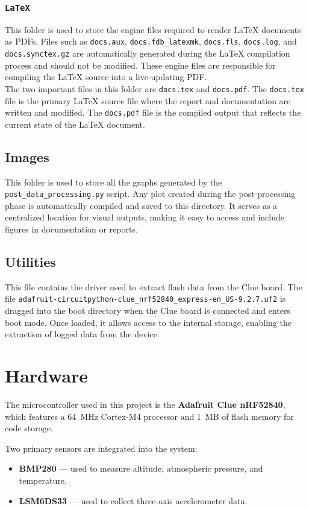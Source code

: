 \documentclass[12pt]{report}
\begin{document}
\subsection{\texttt{LaTeX}}
This folder is used to store the engine files required to render LaTeX documents as PDFs. Files such as \texttt{docs.aux}, \texttt{docs.fdb\_latexmk}, \texttt{docs.fls}, \texttt{docs.log}, and \texttt{docs.synctex.gz} are automatically generated during the LaTeX compilation process and should not be modified. These engine files are responsible for compiling the LaTeX source into a live-updating PDF. \\

The two important files in this folder are \texttt{docs.tex} and \texttt{docs.pdf}. The \texttt{docs.tex} file is the primary LaTeX source file where the report and documentation are written and modified. The \texttt{docs.pdf} file is the compiled output that reflects the current state of the LaTeX document.

\section{Images}

This folder is used to store all the graphs generated by the \texttt{post\_data\_processing.py} script. Any plot created during the post-processing phase is automatically compiled and saved to this directory. It serves as a centralized location for visual outputs, making it easy to access and include figures in documentation or reports.

\section{Utilities}
This file contains the driver used to extract flash data from the Clue board. The file \texttt{adafruit-circuitpython-clue\_nrf52840\_express-en\_US-9.2.7.uf2} is dragged into the boot directory when the Clue board is connected and enters boot mode. Once loaded, it allows access to the internal storage, enabling the extraction of logged data from the device.

\chapter{Hardware}
The microcontroller used in this project is the \textbf{Adafruit Clue nRF52840}, which features a 64~MHz Cortex-M4 processor and 1~MB of flash memory for code storage.

Two primary sensors are integrated into the system:
\begin{itemize}
    \item \textbf{BMP280} — used to measure altitude, atmospheric pressure, and temperature.
    \item \textbf{LSM6DS33} — used to collect three-axis accelerometer data.
\end{itemize}
\end{document}
